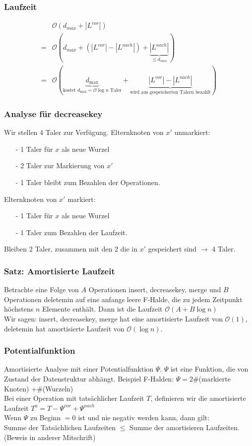 \subsubsection{Laufzeit}
\begin{align*}
& \mathcal{O}(d_{max} + |L^{vor}|)\\
=& \mathcal{O}(d_{max} + (|L^{vor}|-|L^{nach}|) + \underbrace{|L^{nach}|}_{\leq d_{max}})\\
=& \mathcal{O}( \underbrace{ d_{\max} }_{\text{kostet } d_{\max} = \mathcal{O}{\log n} \text{ Taler}} + \underbrace{ |L^{vor}| - |L^{nach}| }_{\text{wird aus gespeicherten Talern bezahlt}})
\end{align*}

\subsubsection{Analyse für decreasekey}
Wir stellen 4 Taler zur Verfügung.
Elternknoten von $x'$ unmarkiert:
\begin{enumerate}
\item[-] 1 Taler für $x$ als neue Wurzel
\item[-] 2 Taler zur Markierung von $x'$
\item[-] 1 Taler bleibt zum Bezahlen der Operationen.
\end{enumerate}
Elternknoten von $x'$ markiert:
\begin{enumerate}
\item[-] 1 Taler für $x$ als neue Wurzel
\item[-] 1 Taler zum Bezahlen der Laufzeit.
\end{enumerate}
Bleiben 2 Taler, zusammen mit den 2 die in $x'$ gespeichert sind $\rightarrow$ 4 Taler.\\
\subsubsection{Satz: Amortisierte Laufzeit}
Betrachte eine Folge von $A$ Operationen insert, decreasekey, merge und $B$ Operationen deletemin auf eine anfangs leere F-Halde, die zu jedem Zeitpunkt höchstens $n$ Elemente enthält. Dann ist die Laufzeit $\mathcal{O}(A + B \log n)$\\
Wir sagen: insert, decreasekey, merge hat eine amortisierte Laufzeit von $\mathcal{O}(1)$, deletemin hat amortisierte Laufzeit von $\mathcal{O}(\log n)$.\\
\subsubsection{Potentialfunktion}
Amortisierte Analyse mit einer Potentialfunktion $\Psi$. $\Psi$ ist eine Funktion, die von Zustand der Datenstruktur abhängt. Beispiel F-Halden: $\Psi = 2 \#$(markierte Knoten) $+ \#$(Wurzeln)\\
Bei einer Operation mit tatsächlicher Laufzeit $T$, definieren wir die amortisierte Laufzeit $T^a = T - \Psi^{vor} + \Psi^{nach}$\\
Wenn $\Psi$ zu Beginn $=0$ ist und nie negativ werden kann, dann gilt:\\
Summe der Tatsächlichen Laufzeiten $\leq $ Summe der amortisieren Laufzeiten.\\
(Beweis in anderer Mitschrift)